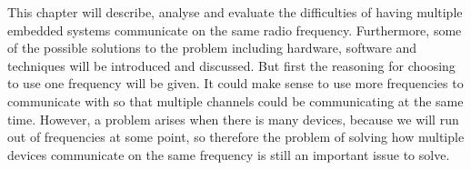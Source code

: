 This chapter will describe, analyse and evaluate the difficulties of having multiple embedded systems communicate on the same radio frequency.
Furthermore, some of the possible solutions to the problem including hardware, software and techniques will be introduced and discussed.
But first the reasoning for choosing to use one frequency will be given.
It could make sense to use more frequencies to communicate with so that multiple channels could be communicating at the same time.
However, a problem arises when there is many devices, because we will run out of frequencies at some point, so therefore the problem of solving how multiple devices communicate on the same frequency is still an important issue to solve.


